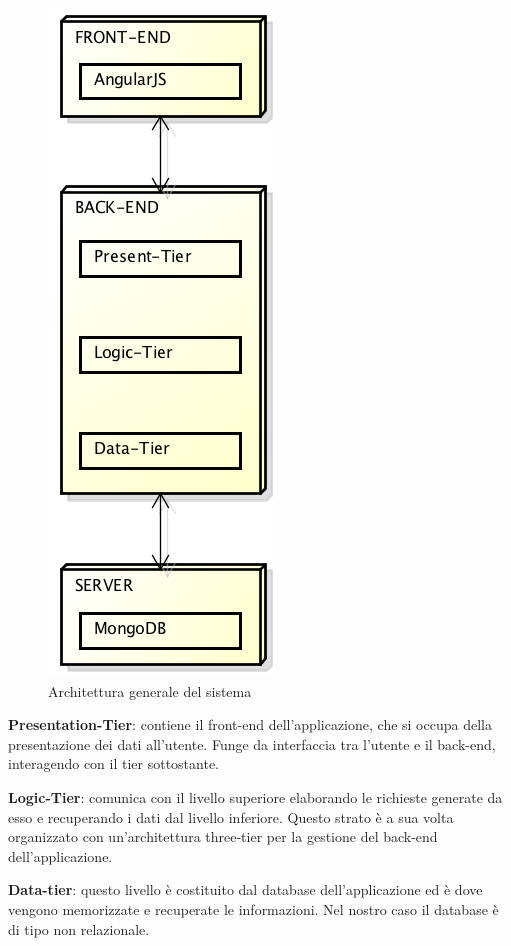 \begin{figure}[h]
	\centering
	\includegraphics[height=0.6\textheight]{img/architettura_generale}
	\caption[Architettura generale del sistema]{Architettura generale del sistema}
\end{figure}

\textbf{Presentation-Tier}: contiene il front-end dell'applicazione, che si occupa della presentazione dei dati all'utente. Funge da interfaccia tra l'utente e il back-end, interagendo con il tier sottostante.

\textbf{Logic-Tier}: comunica con il livello superiore elaborando le richieste generate da esso e recuperando i dati dal livello inferiore. Questo strato è a sua volta organizzato con un'architettura three-tier per la gestione del back-end dell'applicazione.

\textbf{Data-tier}: questo livello è costituito dal database dell'applicazione ed è dove vengono memorizzate e recuperate le informazioni. Nel nostro caso il database è di tipo non relazionale.